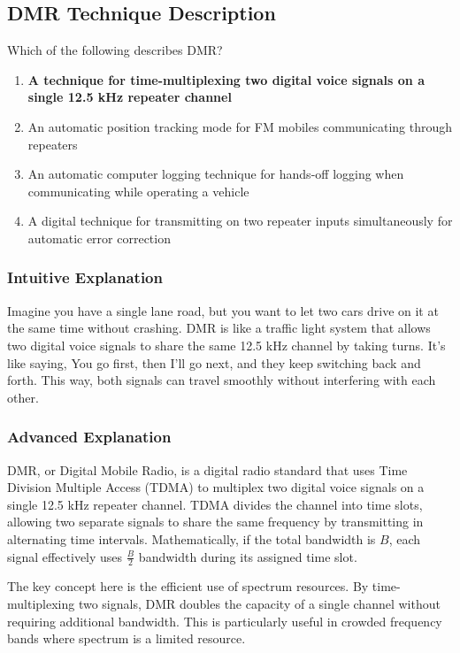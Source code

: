 \subsection{DMR Technique Description}
\label{T8D07}

\begin{tcolorbox}[colback=gray!10!white,colframe=black!75!black,title=T8D07]
Which of the following describes DMR?
\begin{enumerate}[label=\Alph*)]
    \item \textbf{A technique for time-multiplexing two digital voice signals on a single 12.5 kHz repeater channel}
    \item An automatic position tracking mode for FM mobiles communicating through repeaters
    \item An automatic computer logging technique for hands-off logging when communicating while operating a vehicle
    \item A digital technique for transmitting on two repeater inputs simultaneously for automatic error correction
\end{enumerate}
\end{tcolorbox}

\subsubsection*{Intuitive Explanation}
Imagine you have a single lane road, but you want to let two cars drive on it at the same time without crashing. DMR is like a traffic light system that allows two digital voice signals to share the same 12.5 kHz channel by taking turns. It’s like saying, You go first, then I’ll go next, and they keep switching back and forth. This way, both signals can travel smoothly without interfering with each other.

\subsubsection*{Advanced Explanation}
DMR, or Digital Mobile Radio, is a digital radio standard that uses Time Division Multiple Access (TDMA) to multiplex two digital voice signals on a single 12.5 kHz repeater channel. TDMA divides the channel into time slots, allowing two separate signals to share the same frequency by transmitting in alternating time intervals. Mathematically, if the total bandwidth is \( B \), each signal effectively uses \( \frac{B}{2} \) bandwidth during its assigned time slot.

The key concept here is the efficient use of spectrum resources. By time-multiplexing two signals, DMR doubles the capacity of a single channel without requiring additional bandwidth. This is particularly useful in crowded frequency bands where spectrum is a limited resource.

